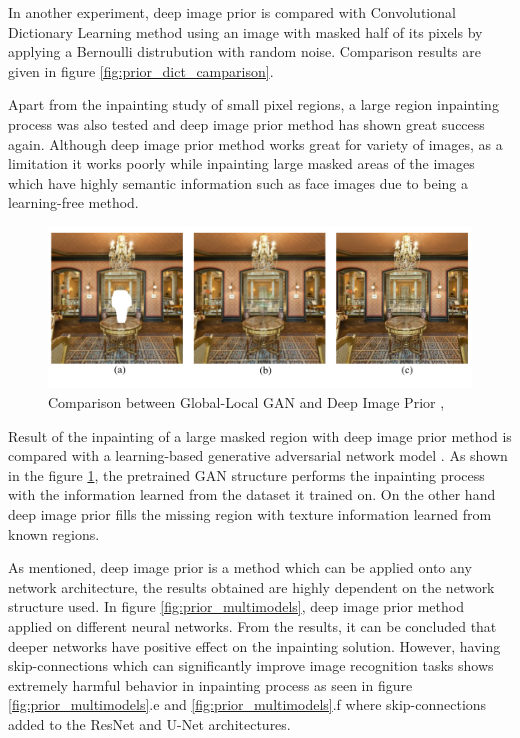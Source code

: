 In another experiment, deep image prior is compared with Convolutional Dictionary Learning method \cite{conv_dict_learning} using an image with masked half of its pixels by applying a Bernoulli distrubution \cite{bernoulli} with random noise. Comparison results are given in figure \ref{fig:prior_dict_camparison}.

Apart from the inpainting study of small pixel regions, a large region inpainting process was also tested and deep image prior method has shown great success again. Although deep image prior method works great for variety of images, as a limitation it works poorly while inpainting large masked areas of the images which have highly semantic information such as face images due to being a learning-free method.

\begin{figure}[h!]
    \centering
    \includegraphics[width=13cm]{figures/chapter4/imprior3.png}
    \caption{Comparison between Global-Local GAN and Deep Image Prior \cite{Iizuka2017}, \cite{deep_image_prior}}
    \label{fig:prior_gan_comparison}
\end{figure}

Result of the inpainting of a large masked region with deep image prior method is compared with a learning-based generative adversarial network model \cite{Iizuka2017}. As shown in the figure \ref{fig:prior_gan_comparison}, the pretrained GAN structure performs the inpainting process with the information learned from the dataset it trained on. On the other hand deep image prior fills the missing region with texture information learned from known regions.

As mentioned, deep image prior is a method which can be applied onto any network architecture, the results obtained are highly dependent on the network structure used. In figure \ref{fig:prior_multimodels}, deep image prior method applied on different neural networks. From the results, it can be concluded that deeper networks have positive effect on the inpainting solution. However, having skip-connections which can significantly improve image recognition tasks shows extremely harmful behavior in inpainting process as seen in figure \ref{fig:prior_multimodels}.e and \ref{fig:prior_multimodels}.f where skip-connections added to the ResNet \cite{deep_residual_recognition} and U-Net \cite{unet} architectures.

